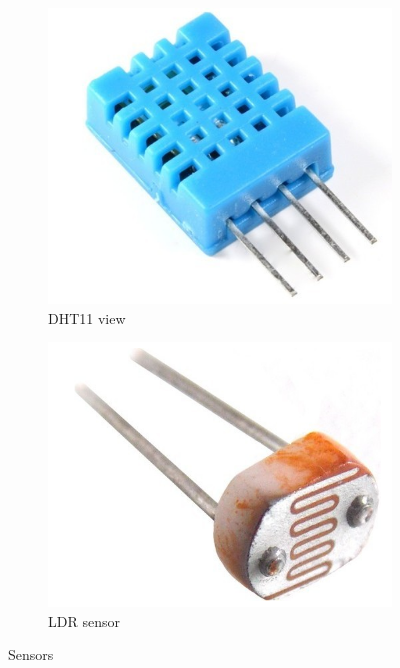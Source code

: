 \begin{figure}[h]
\centering

    \begin{subfigure}[b]{0.2\textwidth}
		\includegraphics[width=\textwidth]{figs/dht11}
		\caption{DHT11 view}
		\label{fig-dht11}
    \end{subfigure}
    \begin{subfigure}[b]{0.2\textwidth}
	\includegraphics[width=\textwidth]{figs/ldr}
	\caption{LDR sensor}
	\label{fig-ldr}
    \end{subfigure}
	\caption{Sensors}
\end{figure}

